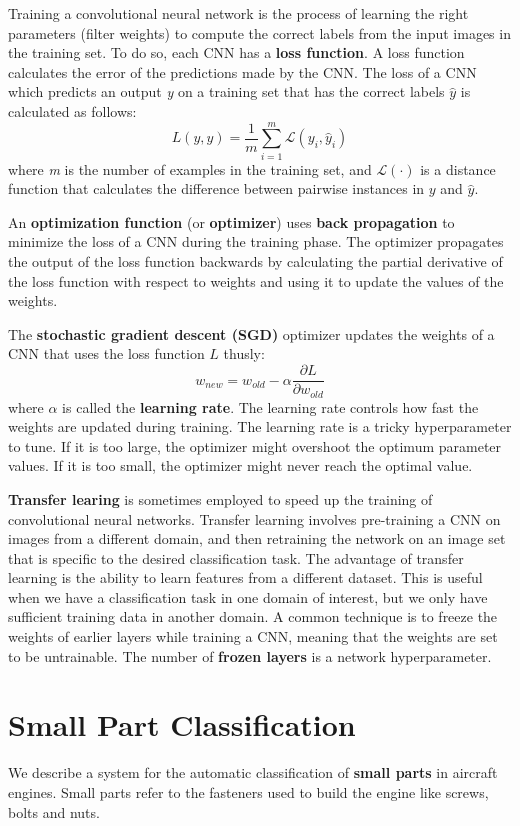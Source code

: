 Training a convolutional neural network is the process of learning the right parameters (filter weights) to compute the correct labels from the input images in the training set. To do so, each CNN has a \textbf{loss function}. A loss function calculates the error of the predictions made by the CNN. The loss of a CNN which predicts an output \textit{y} on a training set that has the correct labels $\hat{y}$ is calculated as follows: \[L(y, \hat{y}) = \dfrac{1}{m}\sum_{i=1}^m \mathscr{L}(y_i, \hat{y}_i)\] where \textit{m} is the number of examples in the training set, and $\mathscr{L}(\cdot)$ is a distance function that calculates the difference between pairwise instances in $y$ and $\hat{y}$.

An \textbf{optimization function} (or \textbf{optimizer}) uses \textbf{back propagation} \cite{lecun1989backpropagation} to minimize the loss of a CNN during the training phase. The optimizer propagates the output of the loss function backwards by calculating the partial derivative of the loss function with respect to weights and using it to update the values of the weights.

The \textbf{stochastic gradient descent (SGD)} optimizer updates the weights of a CNN that uses the loss function $L$ thusly: \[w_{new}=w_{old}-\alpha\dfrac{\partial L}{\partial w_{old}}\] where $\alpha$ is called the \textbf{learning rate}. The learning rate controls how fast the weights are updated during training. The learning rate is a tricky hyperparameter to tune. If it is too large, the optimizer might overshoot the optimum parameter values. If it is too small, the optimizer might never reach the optimal value.

\textbf{Transfer learing} \cite{pan2010survey} is sometimes employed to speed up the training of convolutional neural networks. Transfer learning involves pre-training a CNN on images from a different domain, and then retraining the network on an image set that is specific to the desired classification task. The advantage of transfer learning is the ability to learn features from a different dataset. This is useful when we have a classification task in one domain of interest, but we only have sufficient training data in another domain. A common technique is to freeze the weights of earlier layers while training a CNN, meaning that the weights are set to be untrainable. The number of \textbf{frozen layers} is a network hyperparameter.


\section{Small Part Classification}\label{sec:synth}
We describe a system for the automatic classification of \textbf{small parts} in aircraft engines. Small parts refer to the fasteners used to build the engine like screws, bolts and nuts.

